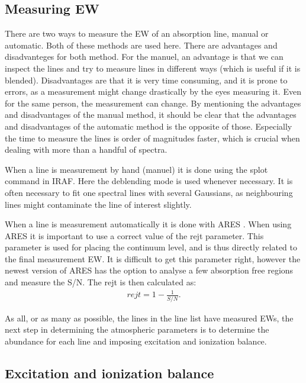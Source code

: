 \subsection{Measuring EW}
\label{sec:measureEW}

There are two ways to measure the EW of an absorption line, manual or automatic.
Both of these methods are used here. There are advantages and disadvanteges for
both method. For the manuel, an advantage is that we can inspect the lines and
try to measure lines in different ways (which is useful if it is blended).
Disadvantages are that it is very time consuming, and it is prone to errors, as
a measurement might change drastically by the eyes measuring it. Even for the
same person, the measurement can change. By mentioning the advantages and
disadvantages of the manual method, it should be clear that the advantages and
disadvantages of the automatic method is the opposite of those. Especially the
time to measure the lines is order of magnitudes faster, which is crucial when
dealing with more than a handful of spectra.

When a line is measurement by hand (manuel) it is done using the splot command
in IRAF. Here the deblending mode is used whenever necessary. It is often
necessary to fit one spectral lines with several Gaussians, as neighbouring
lines might contaminate the line of interest slightly.

When a line is measurement automatically it is done with ARES
\citep{Sousa2007,Sousa2015a}. When using ARES it is important to use a correct
value of the rejt parameter. This parameter is used for placing the continuum
level, and is thus directly related to the final measurement EW. It is difficult
to get this parameter right, however the newest version of ARES has the option
to analyse a few absorption free regions and measure the S/N. The rejt is then
calculated as:
\begin{align*}
  rejt = 1 - \frac{1}{S/N}.
\end{align*}

As all, or as many as possible, the lines in the line list have measured EWs,
the next step in determining the atmospheric parameters is to determine the
abundance for each line and imposing excitation and ionization balance.


\subsection{Excitation and ionization balance}

